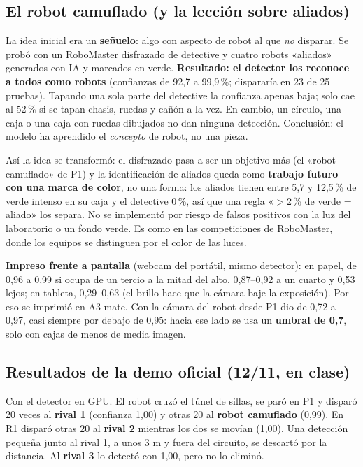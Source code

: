 \documentclass[11pt,a4paper]{article}
\begin{document}
\subsection{El robot camuflado (y la lección sobre aliados)}
La idea inicial era un \textbf{señuelo}: algo con aspecto de robot al que \emph{no} disparar. Se probó con un RoboMaster disfrazado de detective y cuatro robots «aliados» generados con IA y marcados en verde. \textbf{Resultado: el detector los reconoce a todos como robots} (confianzas de 92,7 a 99,9\,\%; dispararía en 23 de 25 pruebas). Tapando una sola parte del detective la confianza apenas baja; solo cae al 52\,\% si se tapan chasis, ruedas y cañón a la vez. En cambio, un círculo, una caja o una caja con ruedas dibujados no dan ninguna detección. Conclusión: el modelo ha aprendido el \emph{concepto} de robot, no una pieza.

Así la idea se transformó: el disfrazado pasa a ser un objetivo más (el «robot camuflado» de P1) y la identificación de aliados queda como \textbf{trabajo futuro con una marca de color}, no una forma: los aliados tienen entre 5,7 y 12,5\,\% de verde intenso en su caja y el detective 0\,\%, así que una regla «$>$2\,\% de verde = aliado» los separa. No se implementó por riesgo de falsos positivos con la luz del laboratorio o un fondo verde. Es como en las competiciones de RoboMaster, donde los equipos se distinguen por el color de las luces.

\textbf{Impreso frente a pantalla} (webcam del portátil, mismo detector): en papel, de 0,96 a 0,99 si ocupa de un tercio a la mitad del alto, 0,87--0,92 a un cuarto y 0,53 lejos; en tableta, 0,29--0,63 (el brillo hace que la cámara baje la exposición). Por eso se imprimió en A3 mate. Con la cámara del robot desde P1 dio de 0,72 a 0,97, casi siempre por debajo de 0,95: hacia ese lado se usa un \textbf{umbral de 0,7}, solo con cajas de menos de media imagen.

\subsection{Resultados de la demo oficial (12/11, en clase)}\label{sec:demo}
Con el detector en GPU. El robot cruzó el túnel de sillas, se paró en P1 y disparó 20 veces al \textbf{rival 1} (confianza 1,00) y otras 20 al \textbf{robot camuflado} (0,99). En R1 disparó otras 20 al \textbf{rival 2} mientras los dos se movían (1,00). Una detección pequeña junto al rival 1, a unos 3 m y fuera del circuito, se descartó por la distancia. Al \textbf{rival 3} lo detectó con 1,00, pero no lo eliminó.
\end{document}
